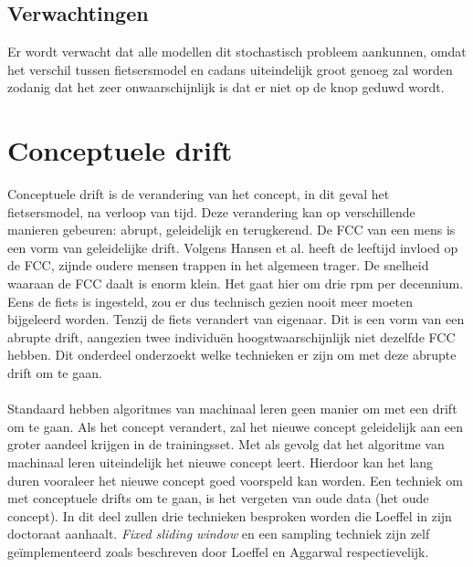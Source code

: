 \subsection{Verwachtingen}
Er wordt verwacht dat alle modellen dit stochastisch probleem aankunnen, omdat het verschil tussen fietsersmodel en cadans uiteindelijk groot genoeg zal worden zodanig dat het zeer onwaarschijnlijk is dat er niet op de knop geduwd wordt.
\section{Conceptuele drift}
Conceptuele drift is de verandering van het concept, in dit geval het fietsersmodel, na verloop van tijd. Deze verandering kan op verschillende manieren gebeuren: abrupt, geleidelijk en terugkerend. De FCC van een mens is een vorm van geleidelijke drift. Volgens Hansen et al. \cite{factors effecting cadence} heeft de leeftijd invloed op de FCC, zijnde oudere mensen trappen in het algemeen trager. De snelheid waaraan de FCC daalt is enorm klein. Het gaat hier om drie rpm per decennium. Eens de fiets is ingesteld, zou er dus technisch gezien nooit meer moeten bijgeleerd worden. Tenzij de fiets verandert van eigenaar. Dit is een vorm van een abrupte drift, aangezien twee individuën hoogstwaarschijnlijk niet dezelfde FCC hebben. Dit onderdeel onderzoekt welke technieken er zijn om met deze abrupte drift om te gaan.
\\\\
Standaard hebben algoritmes van machinaal leren geen manier om met een drift om te gaan. Als het concept verandert, zal het nieuwe concept geleidelijk aan een groter aandeel krijgen in de trainingsset. Met als gevolg dat het algoritme van machinaal leren uiteindelijk het nieuwe concept leert. Hierdoor kan het lang duren vooraleer het nieuwe concept goed voorspeld kan worden. Een techniek om met conceptuele drifts om te gaan, is het vergeten van oude data (het oude concept). In dit deel zullen drie technieken besproken worden die Loeffel \cite{adaptive ml} in zijn doctoraat aanhaalt. \textit{Fixed sliding window} en een sampling techniek zijn zelf geïmplementeerd zoals beschreven door Loeffel \cite{adaptive ml} en Aggarwal \cite{biased reservoir sampling} respectievelijk.
